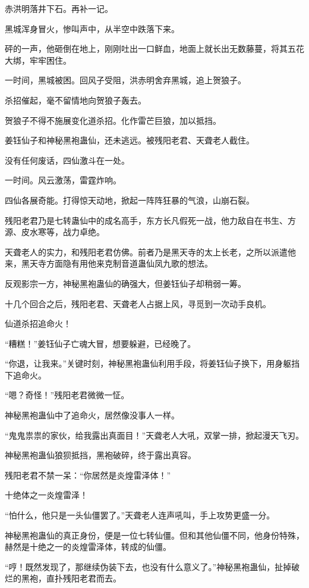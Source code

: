 \begin{this_body}
赤洪明落井下石。再补一记。

黑城浑身冒火，惨叫声中，从半空中跌落下来。

砰的一声，他砸倒在地上，刚刚吐出一口鲜血，地面上就长出无数藤蔓，将其五花大绑，牢牢困住。

一时间，黑城被困。回风子受阻，洪赤明舍弃黑城，追上贺狼子。

杀招催起，毫不留情地向贺狼子轰去。

贺狼子不得不施展变化道杀招。化作雷芒巨狼，加以抵挡。

姜钰仙子和神秘黑袍蛊仙，还未逃远。被残阳老君、天聋老人截住。

没有任何废话，四仙激斗在一处。

一时间。风云激荡，雷霆炸响。

四仙各展奇能。打得惊天动地，掀起一阵阵狂暴的气浪，山崩石裂。

残阳老君乃是七转蛊仙中的成名高手，东方长凡假死一战，他力敌自在书生、方源、皮水寒等，战力卓绝。

天聋老人的实力，和残阳老君仿佛。前者乃是黑天寺的太上长老，之所以派遣他来，黑天寺方面隐有用他来克制音道蛊仙凤九歌的想法。

反观影宗一方，神秘黑袍蛊仙的确强大，但姜钰仙子却稍弱一筹。

十几个回合之后，残阳老君、天聋老人占据上风，寻觅到一次动手良机。

仙道杀招追命火！

“糟糕！”姜钰仙子亡魂大冒，想要躲避，已经晚了。

“你退，让我来。”关键时刻，神秘黑袍蛊仙利用手段，将姜钰仙子换下，用身躯挡下追命火。

“嗯？奇怪！”残阳老君微微一怔。

神秘黑袍蛊仙中了追命火，居然像没事人一样。

“鬼鬼祟祟的家伙，给我露出真面目！”天聋老人大吼，双掌一排，掀起漫天飞刃。

神秘黑袍蛊仙狼狈抵挡，黑袍破碎，终于露出真容。

残阳老君不禁一呆：“你居然是炎煌雷泽体！”

十绝体之一炎煌雷泽！

“怕什么，他只是一头仙僵罢了。”天聋老人连声吼叫，手上攻势更盛一分。

神秘黑袍蛊仙的真正身份，便是一位七转仙僵。但和其他仙僵不同，他身份特殊，赫然是十绝之一的炎煌雷泽体，转成的仙僵。

“哼！既然发现了，那继续伪装下去，也没有什么意义了。”神秘黑袍蛊仙，扯掉破烂的黑袍，直扑残阳老君而去。


\end{this_body}
